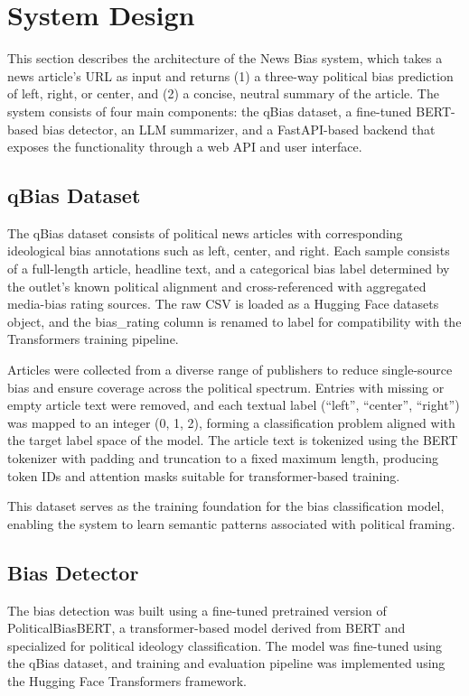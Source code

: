 \documentclass{article}
\begin{document}
\section{System Design}

This section describes the architecture of the News Bias system, which takes a news article’s URL as input and returns (1) a three-way political bias prediction of left, right, or center, and (2) a concise, neutral summary of the article. The system consists of four main components: the qBias dataset, a fine-tuned BERT-based bias detector, an LLM summarizer, and a FastAPI-based backend that exposes the functionality through a web API and user interface.

\subsection{qBias Dataset}

The qBias dataset consists of political news articles with corresponding ideological bias annotations such as left, center, and right. Each sample consists of a full-length article, headline text, and a categorical bias label determined by the outlet’s known political alignment and cross-referenced with aggregated media-bias rating sources. The raw CSV is loaded as a Hugging Face datasets object, and the bias\_rating column is renamed to label for compatibility with the Transformers training pipeline.

Articles were collected from a diverse range of publishers to reduce single-source bias and ensure coverage across the political spectrum. Entries with missing or empty article text were removed, and each textual label (“left”, “center”, “right”) was mapped to an integer (0, 1, 2), forming a classification problem aligned with the target label space of the model. The article text is tokenized using the BERT tokenizer with padding and truncation to a fixed maximum length, producing token IDs and attention masks suitable for transformer-based training.

This dataset serves as the training foundation for the bias classification model, enabling the system to learn semantic patterns associated with political framing.

\subsection{Bias Detector}

The bias detection was built using a fine-tuned pretrained version of PoliticalBiasBERT, a transformer-based model derived from BERT and specialized for political ideology classification. The model was fine-tuned using the qBias dataset, and training and evaluation pipeline was implemented using the Hugging Face Transformers framework.
\end{document}
